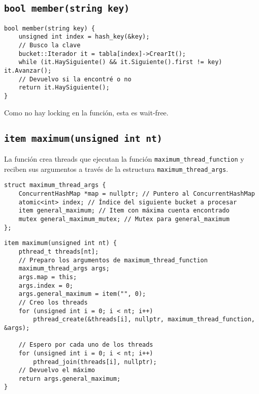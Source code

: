\subsection{\texttt{bool member(string key)}}

\begin{verbatim}
bool member(string key) {
	unsigned int index = hash_key(&key);
	// Busco la clave
	bucket::Iterador it = tabla[index]->CrearIt();
	while (it.HaySiguiente() && it.Siguiente().first != key) it.Avanzar();
	// Devuelvo si la encontré o no
	return it.HaySiguiente();
}
\end{verbatim}

Como no hay locking en la función, esta es wait-free.


\subsection{\texttt{item maximum(unsigned int nt)}}

La función crea threads que ejecutan la función \texttt{maximum_thread_function} y reciben sus argumentos a través de la estructura \texttt{maximum_thread_args}.

\begin{verbatim}
struct maximum_thread_args {
	ConcurrentHashMap *map = nullptr; // Puntero al ConcurrentHashMap
	atomic<int> index; // Índice del siguiente bucket a procesar
	item general_maximum; // Item con máxima cuenta encontrado
	mutex general_maximum_mutex; // Mutex para general_maximum
};
\end{verbatim}

\begin{verbatim}
item maximum(unsigned int nt) {
	pthread_t threads[nt];
	// Preparo los argumentos de maximum_thread_function
	maximum_thread_args args;
	args.map = this;
	args.index = 0;
	args.general_maximum = item("", 0);
	// Creo los threads
	for (unsigned int i = 0; i < nt; i++)
		pthread_create(&threads[i], nullptr, maximum_thread_function, &args);

	// Espero por cada uno de los threads
	for (unsigned int i = 0; i < nt; i++)
		pthread_join(threads[i], nullptr);
	// Devuelvo el máximo
	return args.general_maximum;
}
\end{verbatim}


